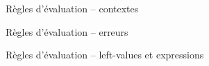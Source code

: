 \begin{figure}

\begin{mathpar}


\end{mathpar}

    \figctx{}

\caption{Règles d'évaluation -- contextes}
\end{figure}

\begin{figure}

\begin{mathpar}


\end{mathpar}

\caption{Règles d'évaluation -- erreurs}
\end{figure}

\begin{figure}

\begin{mathpar}















\end{mathpar}

\caption{Règles d'évaluation -- left-values et expressions }
\end{figure}

